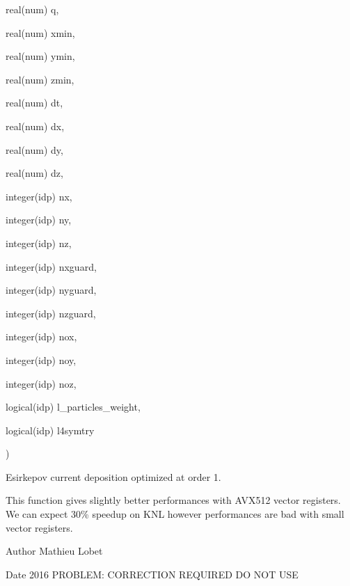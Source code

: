 {\begin{DoxyParamCaption}
\item[{real(num)}]{q, }
\item[{real(num)}]{xmin, }
\item[{real(num)}]{ymin, }
\item[{real(num)}]{zmin, }
\item[{real(num)}]{dt, }
\item[{real(num)}]{dx, }
\item[{real(num)}]{dy, }
\item[{real(num)}]{dz, }
\item[{integer(idp)}]{nx, }
\item[{integer(idp)}]{ny, }
\item[{integer(idp)}]{nz, }
\item[{integer(idp)}]{nxguard, }
\item[{integer(idp)}]{nyguard, }
\item[{integer(idp)}]{nzguard, }
\item[{integer(idp)}]{nox, }
\item[{integer(idp)}]{noy, }
\item[{integer(idp)}]{noz, }
\item[{logical(idp)}]{l\+\_\+particles\+\_\+weight, }
\item[{logical(idp)}]{l4symtry}
\end{DoxyParamCaption}
)}\hypertarget{current__deposition_8_f90_a29f972e9b6064aee31d065c4f54aa184}{}\label{current__deposition_8_f90_a29f972e9b6064aee31d065c4f54aa184}


Esirkepov current deposition optimized at order 1. 

This function gives slightly better performances with A\+V\+X512 vector registers. We can expect 30\% speedup on K\+NL however performances are bad with small vector registers. \begin{DoxyAuthor}{Author}
Mathieu Lobet 
\end{DoxyAuthor}
\begin{DoxyDate}{Date}
2016 P\+R\+O\+B\+L\+EM\+: C\+O\+R\+R\+E\+C\+T\+I\+ON R\+E\+Q\+U\+I\+R\+ED DO N\+OT U\+SE 
\end{DoxyDate}
